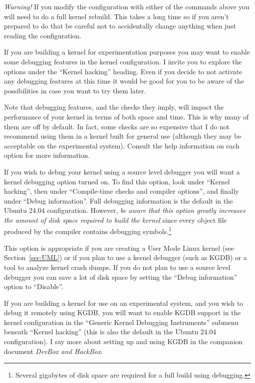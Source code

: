 \documentclass{article}
\begin{document}
\textit{Warning!} If you modify the configuration with either of the commands above you will
need to do a full kernel rebuild. This takes a long time so if you aren't prepared to do that be
careful not to accidentally change anything when just reading the configuration.

If you are building a kernel for experimentation purposes you may want to enable some debugging
features in the kernel configuration. I invite you to explore the options under the ``Kernel
hacking'' heading. Even if you decide to not activate any debugging features at this time it
would be good for you to be aware of the possibilities in case you want to try them later.

Note that debugging features, and the checks they imply, will impact the performance of your
kernel in terms of both space and time. This is why many of them are off by default. In fact,
some checks are so expensive that I do not recommend using them in a kernel built for general
use (although they may be acceptable on the experimental system). Consult the help information
on each option for more information.

If you wish to debug your kernel using a source level debugger you will want a kernel debugging
option turned on. To find this option, look under ``Kernel hacking'', then under ``Compile-time
checks and compiler options'', and finally under ``Debug information''. Full debugging
information is the default in the Ubuntu 24.04 configuration. However, \emph{be aware that this
option greatly increases the amount of disk space required to build the kernel} since every
object file produced by the compiler contains debugging symbols.\footnote{Several gigabytes of
disk space are required for a full build using debugging.}

This option is appropriate if you are creating a User Mode Linux kernel (see
Section~\ref{sec:UML}) or if you plan to use a kernel debugger (such as KGDB) or a tool to
analyze kernel crash dumps. If you do not plan to use a source level debugger you can save a lot
of disk space by setting the ``Debug information'' option to ``Disable''. 

If you are building a kernel for use on an experimental system, and you wish to debug it
remotely using KGDB, you will want to enable KGDB support in the kernel configuration in the
``Generic Kernel Debugging Instruments'' submenu beneath ``Kernel hacking'' (this is also the
default in the Ubuntu 24.04 configuration). I say more about setting up and using KGDB in the
companion document \textit{DevBox and HackBox}.
\end{document}
